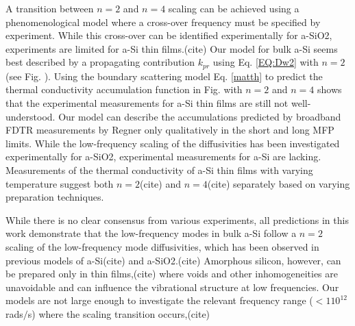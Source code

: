 \documentclass[aps,prb,twocolumn,superscriptaddress,footinbib,amsmath,amssymb,floatfix]{revtex4}
\begin{document}
A transition between $n=2$ and $n=4$ scaling can be 
achieved using a phenomenological model where a cross-over frequency 
must be specified by experiment.
\cite{baldi_elastic_2011} While this cross-over can be identified 
experimentally for a-SiO2,\cite{masciovecchio_evidence_2006} 
experiments are limited for a-Si thin films.(cite) 
Our model for bulk a-Si seems best described by a propagating 
contribution $k_{pr}$ using Eq. \eqref{EQ:Dw2} with $n=2$ (see Fig. ). 
Using the boundary 
scattering model Eq. \eqref{matth} to  predict the thermal conductivity 
accumulation function in Fig. with $n=2$ and $n=4$ shows that 
the experimental measurements for a-Si thin films are still not 
well-understood. Our model can describe the accumulations predicted 
by broadband FDTR measurements by Regner only qualitatively in the 
short and long MFP limits. 
While the low-frequency scaling of the 
diffusivities has been investigated experimentally for a-SiO2, 
experimental measurements for a-Si are lacking. Measurements 
of the thermal conductivity of a-Si thin films with varying 
temperature suggest both 
$n=2$(cite) and 
$n=4$(cite) 
separately based on varying preparation techniques. 

While there is no clear consensus from various experiments, all 
predictions in this 
work demonstrate that  
the low-frequency modes in bulk a-Si follow a $n=2$ scaling 
of the low-frequency mode diffusivities, 
which has been observed in previous models of a-Si(cite) and 
a-SiO2.(cite)
Amorphous silicon, however, can be
prepared only in thin films,(cite) where voids and other 
inhomogeneities are unavoidable\cite{li_effect_2011} and can influence the 
vibrational structure at low frequencies.
\cite{feldman_tight-binding_2004,liu_high_2009} Our models 
are not large enough to investigate the relevant frequency range 
($< 1 10^{12}$ rads$/$s) where the scaling 
transition occurs,(cite) 


% 
% 
% 
\end{document}
